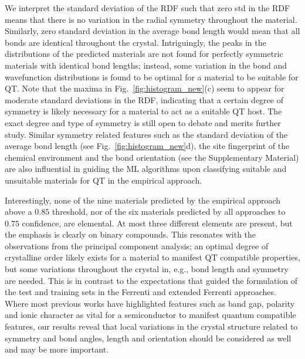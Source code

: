 \documentclass[superscriptaddress,unsortedaddress,
 amsmath,amssymb,
 aps,
]{revtex4-2}
\begin{document}
We interpret the standard deviation  of the RDF such that zero std in the RDF means that there is no variation in the radial symmetry throughout the material. Similarly, zero standard deviation in the average bond length would mean that all bonds are identical throughout the crystal. Intriguingly, the peaks in the distributions of the predicted materials are not found for perfectly symmetric materials with identical bond lengths; instead, some variation in the bond and wavefunction distributions is found to be optimal for a material to be suitable for QT.  
Note that the maxima in Fig.~\ref{fig:histogram_new}(c) seem to appear for moderate standard deviations in the RDF, indicating that a certain degree of symmetry is likely necessary for a material to act as a suitable QT host. The exact degree and type of symmetry is still open to debate and merits further study. 
Similar symmetry related features such as the standard deviation of the average bond length (see Fig.~\ref{fig:histogram_new}d), the site fingerprint of the chemical environment and the bond orientation (see the Supplementary Material) are also influential in guiding the ML algorithms upon classifying suitable and unsuitable materials for QT in the empirical approach. 


Interestingly, none of the nine materials predicted by the empirical approach above a $0.85$ threshold, nor of the six materials predicted by all approaches to $0.75$ confidence, are elemental. At most three different elements are present, but the emphasis is clearly on binary compounds. This resonates with the observations from the principal component analysis; an optimal degree of crystalline order likely exists for a material to manifest QT compatible properties, but some variations throughout the crystal in, e.g., bond length and symmetry are needed. This is in contrast to the expectations that guided the formulation of the test and training sets in the Ferrenti and extended Ferrenti approaches. Where most previous works have highlighted features such as band gap, polarity and ionic character as vital for a semiconductor to manifest quantum compatible features, our results reveal that local variations in the crystal structure related to symmetry and bond angles, length and orientation should be considered as well and may be more important. 
\end{document}
